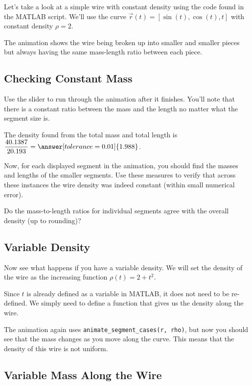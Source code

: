 \documentclass{ximera}
\begin{document}
Let's take a look at a simple wire with constant density using the code found in the MATLAB script. We'll use the curve $\vec{r}(t) = [\sin(t), \cos(t), t]$ with constant density $\rho = 2$.

The animation shows the wire being broken up into smaller and smaller pieces but always having the same mass-length ratio between each piece.

\subsection*{Checking Constant Mass}

Use the slider to run through the animation after it finishes. You'll note that there is a constant ratio between the mass and the length no matter what the segment size is.

\begin{problem}
The density found from the total mass and total length is $\dfrac{40.1387}{20.193} = \answer[tolerance=0.01]{1.988}$.  

Now, for each displayed segment in the animation, you should find the masses and lengths of the smaller segments. Use these measures to verify that across these instances the wire density was indeed constant (within small numerical error).

Do the mass-to-length ratios for individual segments agree with the overall density (up to rounding)? 
\end{problem}

\subsection*{Variable Density}

Now see what happens if you have a variable density. We will set the density of the wire as the increasing function $\rho(t) = 2 + t^2$.

Since $t$ is already defined as a variable in MATLAB, it does not need to be re-defined. We simply need to define a function that gives us the density along the wire.

The animation again uses \texttt{animate\_segment\_cases(r, rho)}, but now you should see that the mass changes as you move along the curve. This means that the density of this wire is not uniform.

\subsection*{Variable Mass Along the Wire}
\end{document}
